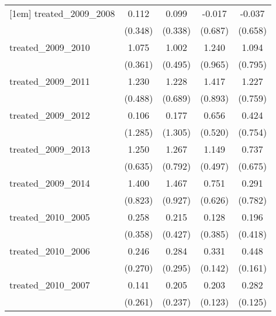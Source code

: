 {\begin{tabular}{l*{4}{c}}
[1em]
treated\_2009\_2008&       0.112         &       0.099         &      -0.017         &      -0.037         \\
            &     (0.348)         &     (0.338)         &     (0.687)         &     (0.658)         \\
[1em]
treated\_2009\_2010&       1.075\sym{**} &       1.002\sym{*}  &       1.240         &       1.094         \\
            &     (0.361)         &     (0.495)         &     (0.965)         &     (0.795)         \\
[1em]
treated\_2009\_2011&       1.230\sym{*}  &       1.228         &       1.417         &       1.227         \\
            &     (0.488)         &     (0.689)         &     (0.893)         &     (0.759)         \\
[1em]
treated\_2009\_2012&       0.106         &       0.177         &       0.656         &       0.424         \\
            &     (1.285)         &     (1.305)         &     (0.520)         &     (0.754)         \\
[1em]
treated\_2009\_2013&       1.250\sym{*}  &       1.267         &       1.149\sym{*}  &       0.737         \\
            &     (0.635)         &     (0.792)         &     (0.497)         &     (0.675)         \\
[1em]
treated\_2009\_2014&       1.400         &       1.467         &       0.751         &       0.291         \\
            &     (0.823)         &     (0.927)         &     (0.626)         &     (0.782)         \\
[1em]
treated\_2010\_2005&       0.258         &       0.215         &       0.128         &       0.196         \\
            &     (0.358)         &     (0.427)         &     (0.385)         &     (0.418)         \\
[1em]
treated\_2010\_2006&       0.246         &       0.284         &       0.331\sym{*}  &       0.448\sym{**} \\
            &     (0.270)         &     (0.295)         &     (0.142)         &     (0.161)         \\
[1em]
treated\_2010\_2007&       0.141         &       0.205         &       0.203         &       0.282\sym{*}  \\
            &     (0.261)         &     (0.237)         &     (0.123)         &     (0.125)         \\

\end{tabular}}
